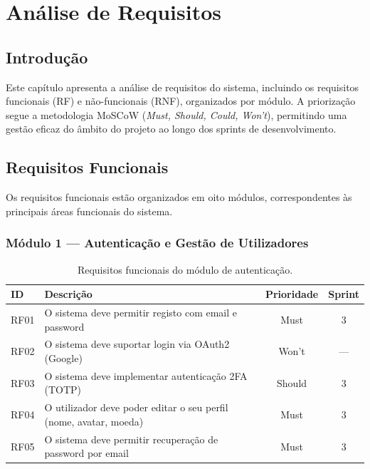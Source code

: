 \chapter{Análise de Requisitos}
\label{chap:requisitos}

\section{Introdução}
\label{sec:req-intro}

Este capítulo apresenta a análise de requisitos do sistema, incluindo os requisitos funcionais (RF) e não-funcionais (RNF), organizados por módulo. A priorização segue a metodologia MoSCoW (\textit{Must, Should, Could, Won't}), permitindo uma gestão eficaz do âmbito do projeto ao longo dos sprints de desenvolvimento.


\section{Requisitos Funcionais}
\label{sec:req-funcionais}

Os requisitos funcionais estão organizados em oito módulos, correspondentes às principais áreas funcionais do sistema.

\subsection{Módulo 1 --- Autenticação e Gestão de Utilizadores}

\begin{table}[H]
\centering
\caption{Requisitos funcionais do módulo de autenticação.}
\label{tab:rf-auth}
\small
\begin{tabularx}{\textwidth}{l X c c}
\toprule
\textbf{ID} & \textbf{Descrição} & \textbf{Prioridade} & \textbf{Sprint} \\
\midrule
RF01 & O sistema deve permitir registo com email e password & Must & 3 \\
RF02 & O sistema deve suportar login via OAuth2 (Google) & Won't & --- \\
RF03 & O sistema deve implementar autenticação \ac{2FA} (TOTP) & Should & 3 \\
RF04 & O utilizador deve poder editar o seu perfil (nome, avatar, moeda) & Must & 3 \\
RF05 & O sistema deve permitir recuperação de password por email & Must & 3 \\
\bottomrule
\end{tabularx}
\end{table}

